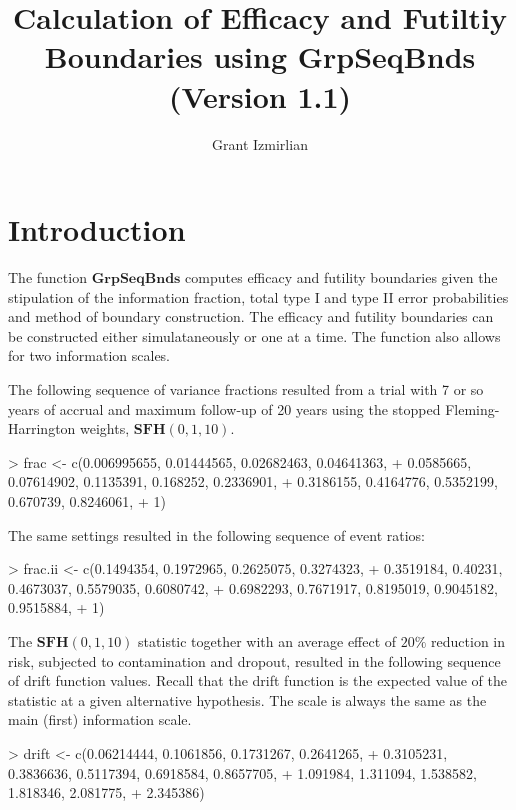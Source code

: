 \documentclass{article}
\begin{document}
\title{Calculation of Efficacy and Futiltiy Boundaries using GrpSeqBnds (Version 1.1)}
\author{Grant Izmirlian}
\maketitle

\section{Introduction}
The function $\mathbf{GrpSeqBnds}$ computes efficacy and futility boundaries given the
stipulation of the information fraction, total type I and type II error probabilities and method
of boundary construction.  The efficacy and futility boundaries can be constructed either
simulataneously or one at a time.  The function also allows for two information scales.



The following sequence of variance fractions resulted from a trial with 7 or so years of accrual
and maximum follow-up of 20 years using the stopped Fleming-Harrington weights, $\mathbf{SFH}(0,1,10)$.
\begin{Schunk}
\begin{Sinput}
> frac <- c(0.006995655, 0.01444565, 0.02682463, 0.04641363, 
+     0.0585665, 0.07614902, 0.1135391, 0.168252, 0.2336901, 
+     0.3186155, 0.4164776, 0.5352199, 0.670739, 0.8246061, 
+     1)
\end{Sinput}
\end{Schunk}

The same settings resulted in the following sequence of event ratios:

\begin{Schunk}
\begin{Sinput}
> frac.ii <- c(0.1494354, 0.1972965, 0.2625075, 0.3274323, 
+     0.3519184, 0.40231, 0.4673037, 0.5579035, 0.6080742, 
+     0.6982293, 0.7671917, 0.8195019, 0.9045182, 0.9515884, 
+     1)
\end{Sinput}
\end{Schunk}

The $\mathbf{SFH}(0,1,10)$ statistic together with an average effect of $20\%$
reduction in risk, subjected to contamination and dropout, resulted in the
following sequence of drift function values.  Recall that the drift function
is the expected value of the statistic at a given alternative hypothesis.  The
scale is always the same as the main (first) information scale.  

\begin{Schunk}
\begin{Sinput}
> drift <- c(0.06214444, 0.1061856, 0.1731267, 0.2641265, 
+     0.3105231, 0.3836636, 0.5117394, 0.6918584, 0.8657705, 
+     1.091984, 1.311094, 1.538582, 1.818346, 2.081775, 
+     2.345386)
\end{Sinput}
\end{Schunk}
\end{document}

